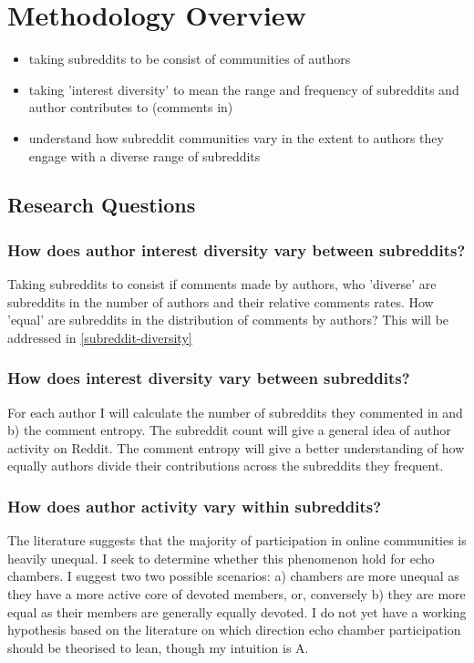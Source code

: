 \section{Methodology Overview}
\begin{itemize}
    \item taking subreddits to be consist of communities of authors
    \item taking 'interest diversity' to mean the range and frequency of subreddits and author contributes to (comments in)
    \item understand how subreddit communities vary in the extent to authors they engage with a diverse range of subreddits
\end{itemize}

\subsection{Research Questions}
\subsubsection{How does author interest diversity vary between subreddits?}
Taking subreddits to consist if comments made by authors, who 'diverse' are subreddits in the number of authors and their relative comments rates. How 'equal' are subreddits in the distribution of comments by authors? This will be addressed in \ref{subreddit-diversity}


\subsubsection{How does interest diversity vary between subreddits?}
For each author I will calculate the number of subreddits they commented in and b) the comment entropy. The subreddit count will give a general idea of author activity on Reddit. The comment entropy will give a better understanding of how equally authors divide their contributions across the subreddits they frequent.


\subsubsection{How does author activity vary within subreddits?}
The literature suggests that the majority of participation in online communities is heavily unequal. I seek to determine whether this phenomenon hold for echo chambers. I suggest two two possible scenarios: a) chambers are more unequal as they have a more active core of devoted members, or, conversely b) they are more equal as their members are generally equally devoted. I do not yet have a working hypothesis based on the literature on which direction echo chamber participation should be theorised to lean, though my intuition is A.

